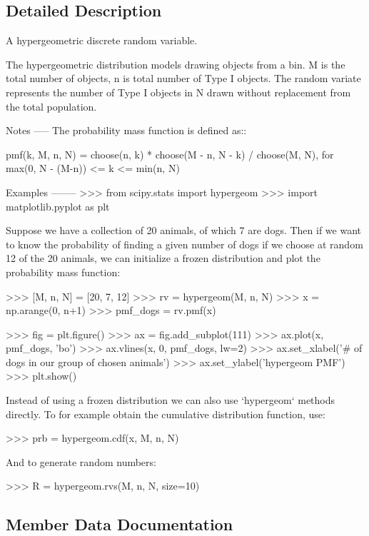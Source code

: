 \subsection{Detailed Description}
\begin{DoxyVerb}A hypergeometric discrete random variable.

The hypergeometric distribution models drawing objects from a bin.
M is the total number of objects, n is total number of Type I objects.
The random variate represents the number of Type I objects in N drawn
without replacement from the total population.


Notes
-----
The probability mass function is defined as::

    pmf(k, M, n, N) = choose(n, k) * choose(M - n, N - k) / choose(M, N),
                                   for max(0, N - (M-n)) <= k <= min(n, N)

Examples
--------
>>> from scipy.stats import hypergeom
>>> import matplotlib.pyplot as plt

Suppose we have a collection of 20 animals, of which 7 are dogs.  Then if
we want to know the probability of finding a given number of dogs if we
choose at random 12 of the 20 animals, we can initialize a frozen
distribution and plot the probability mass function:

>>> [M, n, N] = [20, 7, 12]
>>> rv = hypergeom(M, n, N)
>>> x = np.arange(0, n+1)
>>> pmf_dogs = rv.pmf(x)

>>> fig = plt.figure()
>>> ax = fig.add_subplot(111)
>>> ax.plot(x, pmf_dogs, 'bo')
>>> ax.vlines(x, 0, pmf_dogs, lw=2)
>>> ax.set_xlabel('# of dogs in our group of chosen animals')
>>> ax.set_ylabel('hypergeom PMF')
>>> plt.show()

Instead of using a frozen distribution we can also use `hypergeom`
methods directly.  To for example obtain the cumulative distribution
function, use:

>>> prb = hypergeom.cdf(x, M, n, N)

And to generate random numbers:

>>> R = hypergeom.rvs(M, n, N, size=10)\end{DoxyVerb}
 

\subsection{Member Data Documentation}
\hypertarget{classscipy_1_1stats_1_1__discrete__distns_1_1hypergeom__gen_a16af028db64b391cc5f2780784969302}{}
